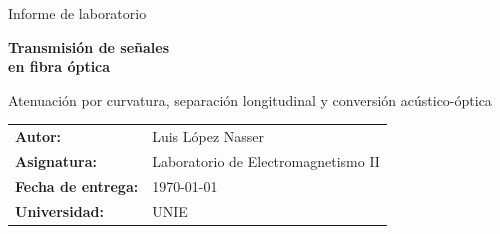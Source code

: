 \documentclass[12pt,a4paper]{article}
\begin{document}
\begin{titlepage}
  \centering
  \vspace*{2cm}
  {\large Informe de laboratorio\par}
  \vspace{0.5cm}
  {\LARGE \textbf{Transmisión de señales\\[4pt] en fibra óptica}\par}
  \vspace{0.8cm}
  {\normalsize Atenuación por curvatura, separación longitudinal y conversión acústico-óptica\par}
  \vspace{1.2cm}
  \begin{tabular}{>{\bfseries}p{4cm} p{8cm}}
    Autor:            & Luis López Nasser \\
    Asignatura:       & Laboratorio de Electromagnetismo II \\
    Fecha de entrega: & \today \\
    Universidad:      & UNIE \\
  \end{tabular}
  \vfill
\end{titlepage}

\tableofcontents
\clearpage
\end{document}
